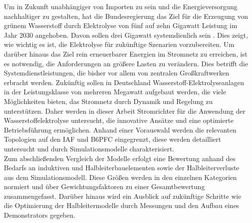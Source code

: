 Um in Zukunft unabhängiger von Importen zu sein und die Energieversorgung nachhaltiger zu gestalten, hat die Bundesregierung das Ziel für die Erzeugung von grünem Wasserstoff durch Elektrolyse von fünf auf zehn Gigawatt Leistung im Jahr 2030 angehoben. Davon sollen drei Gigawatt systemdienlich sein \cite{BMWKH2}. Dies zeigt, wie wichtig es ist, die Elektrolyse für zukünftige Szenarien vorzubereiten.
Um darüber hinaus das Ziel rein erneuerbarer Energien im Stromnetz zu erreichen, ist es notwendig, die Anforderungen an größere Lasten zu verändern. Dies betrifft die Systemdienstleistungen, die bisher vor allem von zentralen Großkraftwerken erbracht werden. Zukünftig sollen in Deutschland Wasserstoff-Elektrolyseanlagen in der Leistungsklasse von mehreren Megawatt aufgebaut werden, die viele Möglichkeiten bieten, das Stromnetz durch Dynamik und Regelung zu unterstützen. Daher werden in dieser Arbeit Stromrichter für die Anwendung der Wasserstoffelektrolyse untersucht, die innovative Ansätze und eine optimierte Betriebsführung ermöglichen. Anhand einer Vorauswahl werden die relevanten Topologien auf den \gls{IAF} und \gls{B6PFC} eingegrenzt, diese werden detailliert untersucht und durch Simulationsmodelle charakterisiert.\\
Zum abschließenden Vergleich der Modelle erfolgt eine Bewertung anhand des Bedarfs an induktiven und Halbleiterbauelementen sowie der Halbleiterverluste aus dem Simulationsmodell. Diese Größen werden in den einzelnen Kategorien normiert und über Gewichtungsfaktoren zu einer Gesamtbewertung zusammengefasst. Darüber hinaus wird ein Ausblick auf zukünftige Schritte wie die Optimierung der Halbleitermodelle durch Messungen und den Aufbau eines Demonstrators gegeben.
